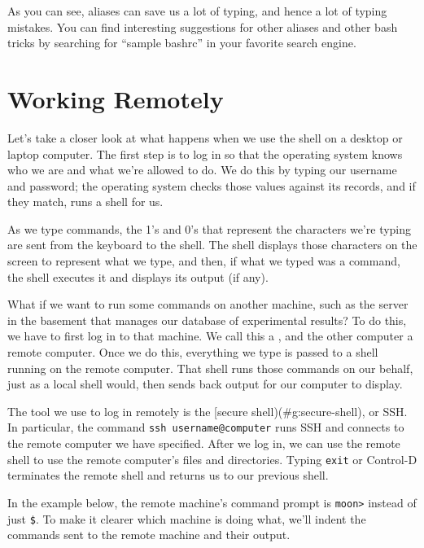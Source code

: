 \documentclass{book}
\begin{document}
As you can see, aliases can save us a lot of typing, and hence a lot of
typing mistakes. You can find interesting suggestions for other aliases
and other bash tricks by searching for ``sample bashrc'' in your
favorite search engine.

\section{Working Remotely}

Let's take a closer look at what happens when we use the shell on a
desktop or laptop computer. The first step is to log in so that the
operating system knows who we are and what we're allowed to do. We do
this by typing our username and password; the operating system checks
those values against its records, and if they match, runs a shell for
us.

As we type commands, the 1's and 0's that represent the characters we're
typing are sent from the keyboard to the shell. The shell displays those
characters on the screen to represent what we type, and then, if what we
typed was a command, the shell executes it and displays its output (if
any).

What if we want to run some commands on another machine, such as the
server in the basement that manages our database of experimental
results? To do this, we have to first log in to that machine. We call
this a , and the other computer a
remote computer. Once we do this, everything we type is passed to a
shell running on the remote computer. That shell runs those commands on
our behalf, just as a local shell would, then sends back output for our
computer to display.

The tool we use to log in remotely is the {[}secure
shell)(\#g:secure-shell), or SSH. In particular, the command
\texttt{ssh username@computer} runs SSH and connects to the remote
computer we have specified. After we log in, we can use the remote shell
to use the remote computer's files and directories. Typing \texttt{exit}
or Control-D terminates the remote shell and returns us to our previous
shell.

In the example below, the remote machine's command prompt is
\texttt{moon\textgreater{}} instead of just \texttt{\$}. To make it
clearer which machine is doing what, we'll indent the commands sent to
the remote machine and their output.

\end{document}
